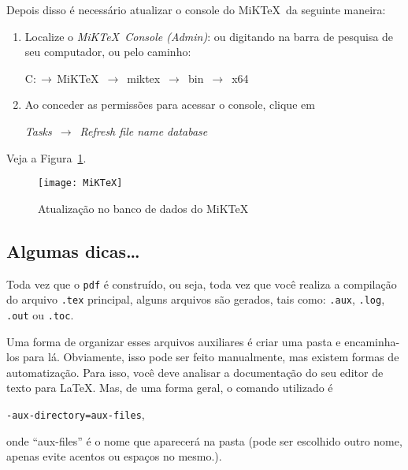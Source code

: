 Depois disso é necessário atualizar o console do MiK\TeX\ da seguinte maneira:
\begin{enumerate}
  \item[(1)] Localize o \emph{MiK\TeX\ Console (Admin)}: ou digitando na barra 
   de pesquisa de seu computador, ou pelo caminho:
   \begin{center}
    \ovalbox
    {
     \begin{minipage}{0.6\linewidth}
      C:\,$\rightarrow$\,MiKTeX \,$\rightarrow$\, miktex \,$\rightarrow$\, bin \,$\rightarrow$\, x64 
     \end{minipage}
    }
   \end{center}
  \item[(2)] Ao conceder as permissões para acessar o console, clique em 
   \begin{center}
    \ovalbox
    {
     \begin{minipage}{0.5\linewidth}
      \emph{Tasks} \,$\rightarrow$\, \emph{Refresh file name database}
     \end{minipage}
    }
   \end{center}
\end{enumerate}

Veja a Figura~\ref{fig:MiKTeX}.

\begin{figure}[!htbp]
  \centering
  \caption{Atualização no banco de dados do MiK\TeX }
  \texttt{[image: MiKTeX]}
  \label{fig:MiKTeX}
\end{figure}
%
\subsection{Algumas dicas\ldots} 
%
Toda vez que o \texttt{pdf} é construído, ou seja, toda vez que você realiza a
compilação do arquivo \texttt{.tex} principal, alguns arquivos são gerados, tais
como: \texttt{.aux}, \texttt{.log}, \texttt{.out} ou \texttt{.toc}.

Uma forma de organizar esses arquivos auxiliares é criar uma pasta e 
encaminha-los para lá.
Obviamente, isso pode ser feito manualmente, mas existem formas de automatização.
Para isso, você deve analisar a documentação do seu editor de texto para \LaTeX.
Mas, de uma forma geral, o comando utilizado é 
\begin{center}
 \texttt{-aux-directory=aux-files},
\end{center}
onde ``aux-files'' é o nome que aparecerá na pasta (pode ser escolhido outro 
nome, apenas evite acentos ou espaços no mesmo.). 

